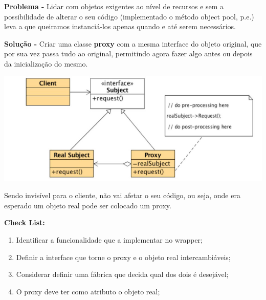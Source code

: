 \documentclass{article}
\begin{document}
\begin{flushleft}
    \textbf{Problema -} Lidar com objetos exigentes ao nível de recursos e sem a possibilidade de alterar o
    seu código (implementado o método object pool, p.e.) leva a que queiramos
    instanciá-los apenas quando e até serem necessários.
\end{flushleft}

\begin{flushleft}
    \textbf{Solução -} Criar uma classe \textbf{proxy} com a mesma interface do objeto original, que por sua vez
    passa tudo ao original, permitindo agora fazer algo antes ou depois da inicialização
    do mesmo.

    \begin{center}
        \includegraphics[scale=0.35]{Images/55.png}
    \end{center}

    Sendo invisível para o cliente, não vai afetar o seu código, ou seja, onde era
    esperado um objeto real pode ser colocado um proxy.
\end{flushleft}

\begin{flushleft}
    \textbf{Check List:}

    \begin{enumerate}
        \item Identificar a funcionalidade que a implementar no wrapper;
        \item Definir a interface que torne o proxy e o objeto real intercambiáveis;
        \item Considerar definir uma fábrica que decida qual dos dois é desejável;
        \item O proxy deve ter como atributo o objeto real;
    \end{enumerate}
\end{flushleft}

\pagebreak
\end{document}

